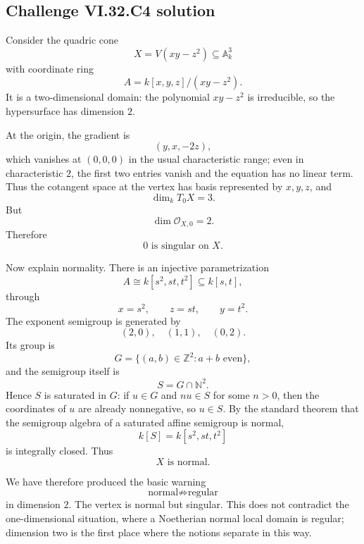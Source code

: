 \subsection*{Challenge VI.32.C4 solution}
\begin{solution}
Consider the quadric cone
\[
X=V(xy-z^2)\subseteq\mathbb A^3_k
\]
with coordinate ring
\[
A=k[x,y,z]/(xy-z^2).
\]
It is a two-dimensional domain: the polynomial \(xy-z^2\) is irreducible, so the hypersurface has dimension \(2\).

At the origin, the gradient is
\[
(y,x,-2z),
\]
which vanishes at \((0,0,0)\) in the usual characteristic range; even in characteristic \(2\), the first two
entries vanish and the equation has no linear term.  Thus the cotangent space at the vertex has basis represented
by \(x,y,z\), and
\[
\dim_kT_0X=3.
\]
But
\[
\dim\mathcal O_{X,0}=2.
\]
Therefore
\[
\boxed{0\text{ is singular on }X}.
\]

Now explain normality.  There is an injective parametrization
\[
A
\cong
k[s^2,st,t^2]
\subseteq
k[s,t],
\]
through
\[
x=s^2,\qquad z=st,\qquad y=t^2.
\]
The exponent semigroup is generated by
\[
(2,0),\quad(1,1),\quad(0,2).
\]
Its group is
\[
G=\{(a,b)\in\mathbb Z^2:a+b\text{ even}\},
\]
and the semigroup itself is
\[
S=G\cap\mathbb N^2.
\]
Hence \(S\) is saturated in \(G\): if \(u\in G\) and \(nu\in S\) for some \(n>0\), then the coordinates of \(u\)
are already nonnegative, so \(u\in S\).  By the standard theorem that the semigroup algebra of a saturated affine
semigroup is normal,
\[
k[S]=k[s^2,st,t^2]
\]
is integrally closed. Thus
\[
\boxed{X\text{ is normal}.}
\]

We have therefore produced the basic warning
\[
\boxed{\text{normal}\not\Longrightarrow\text{regular}}
\]
in dimension \(2\).  The vertex is normal but singular.  This does not contradict the one-dimensional situation,
where a Noetherian normal local domain is regular; dimension two is the first place where the notions separate in
this way.
\end{solution}

